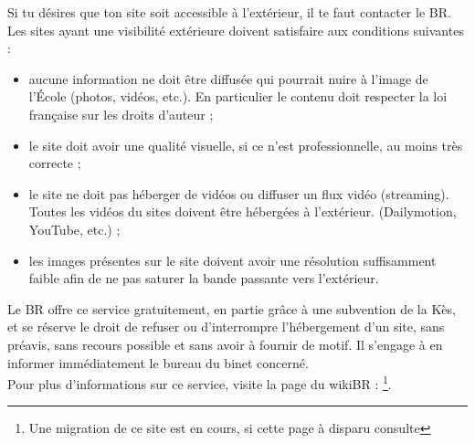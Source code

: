 Si tu désires que ton site soit accessible à l'extérieur, il te faut contacter le BR. Les sites ayant une visibilité extérieure doivent satisfaire aux conditions suivantes :
\begin{itemize}
    \item aucune information ne doit être diffusée qui pourrait nuire à l'image de l'École (photos, vidéos, etc.). En particulier le contenu doit respecter la loi française sur les droits d'auteur ;
    \item le site doit avoir une qualité visuelle, si ce n'est professionnelle, au moins très correcte ;
    \item le site ne doit pas héberger de vidéos ou diffuser un flux vidéo (streaming). Toutes les vidéos du sites doivent être hébergées à l'extérieur. (Dailymotion, YouTube, etc.) ;
    \item les images présentes sur le site doivent avoir une résolution suffisamment faible afin de ne pas saturer la bande passante vers l'extérieur.
\end{itemize}

Le BR offre ce service gratuitement, en partie grâce à une subvention de la Kès, et se réserve le droit de refuser ou d'interrompre l'hébergement d'un site, sans préavis, sans recours possible et sans avoir à fournir de motif.
Il s'engage à en informer immédiatement le bureau du binet concerné.\\
Pour plus d'informations sur ce service, visite la page du wikiBR : \newline {}\footnote{Une migration de ce site est en cours, si cette page à disparu consulte }.
